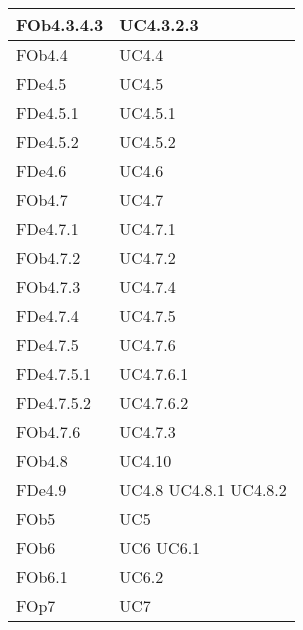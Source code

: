 \begin{longtable}{|l|p{4cm}|}
\hline
FOb4.3.4.3 & UC4.3.2.3 \linebreak  \\ 
\hline
FOb4.4 & UC4.4 \linebreak  \\ 
\hline
FDe4.5 & UC4.5 \linebreak  \\ 
\hline
FDe4.5.1 & UC4.5.1 \linebreak  \\ 
\hline
FDe4.5.2 & UC4.5.2 \linebreak  \\ 
\hline
FDe4.6 & UC4.6 \linebreak  \\ 
\hline
FOb4.7 & UC4.7 \linebreak  \\ 
\hline
FDe4.7.1 & UC4.7.1 \linebreak  \\ 
\hline
FOb4.7.2 & UC4.7.2 \linebreak  \\ 
\hline
FOb4.7.3 & UC4.7.4 \linebreak  \\ 
\hline
FDe4.7.4 & UC4.7.5 \linebreak  \\ 
\hline
FDe4.7.5 & UC4.7.6 \linebreak  \\ 
\hline
FDe4.7.5.1 & UC4.7.6.1 \linebreak  \\ 
\hline
FDe4.7.5.2 & UC4.7.6.2 \linebreak  \\ 
\hline
FOb4.7.6 & UC4.7.3 \linebreak  \\ 
\hline
FOb4.8 & UC4.10 \linebreak  \\ 
\hline
FDe4.9 & UC4.8 \linebreak  UC4.8.1 \linebreak  UC4.8.2 \linebreak  \\ 
\hline
FOb5 & UC5 \linebreak \\ 
\hline
FOb6 & UC6 \linebreak UC6.1 \linebreak \\ 
\hline
FOb6.1 & UC6.2 \linebreak  \\ 
\hline
FOp7 & UC7 \linebreak \\ 

\end{longtable}
